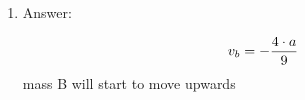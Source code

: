 \begin{enumerate}
\begin{enumerate}
          \end{enumerate}
          \item Answer:
          \begin{answer}
              \begin{align}
                  v_b = - \frac{4 \cdot a}{9} \notag
              \end{align}
              mass B will start to move upwards
          \end{answer}
\end{enumerate}